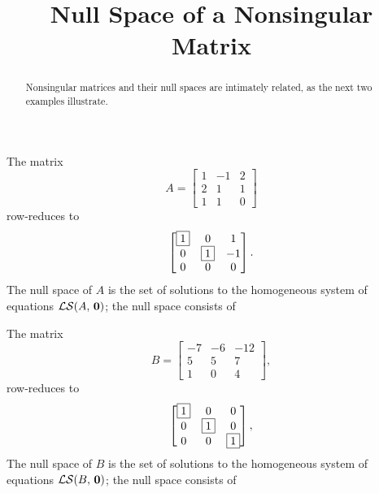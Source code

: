 \documentclass{ximera}
\title{Null Space of a Nonsingular Matrix}
\begin{document}
\begin{abstract}
  Nonsingular matrices and their null spaces are intimately related,
  as the next two examples illustrate.
\end{abstract}
\maketitle

\begin{example}
  The  matrix
  \[
    A = \begin{bmatrix}
      1 & -1 & 2 \\
      2 & 1 & 1 \\
      1 & 1 & 0 
    \end{bmatrix}
  \]
  row-reduces to
  \[
    \begin{bmatrix}
      \fbox{1} & 0 & 1 \\
      0 & \fbox{1} & -1 \\
      0 & 0 & 0 
    \end{bmatrix}.
  \]
  The null space of $A$ is the set of solutions to the homogeneous
  system of equations $\mathcal{LS}\!\left(A,\,\mathbf{0}\right)$; the null space consists of 
  \begin{multipleChoice}
  \end{multipleChoice}
\end{example}

\begin{example}
  The  matrix
  \[
    B = \begin{bmatrix}
      -7&-6&- 12\\
      5&5&7 \\
      1&0&4
    \end{bmatrix},
  \]
  row-reduces to
  \[
    \begin{bmatrix}
      \fbox{1}&0&0 \\
      0&\fbox{1}&0 \\
      0&0&\fbox{1}
    \end{bmatrix},
  \]
  The null space of $B$ is the set of solutions to the homogeneous
  system of equations $\mathcal{LS}\!\left(B,\,\mathbf{0}\right)$; the null space consists of 
  \begin{multipleChoice}
  \end{multipleChoice}
\end{example}
\end{document}
